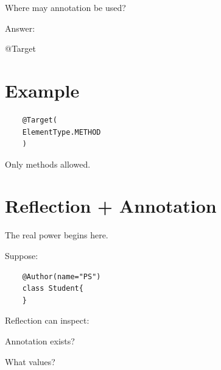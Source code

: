 \documentclass[11pt,a4paper]{book}
\begin{document}
Where may annotation be used?


Answer:


@Target


\section{Example}

\begin{verbatim} 
    @Target(
    ElementType.METHOD
    )
\end{verbatim}


Only methods allowed.


\section{Reflection + Annotation}

The real power begins here.


Suppose:

\begin{verbatim} 
    @Author(name="PS")
    class Student{
    }
\end{verbatim}


Reflection can inspect:


Annotation exists?


What values?


\end{document}
